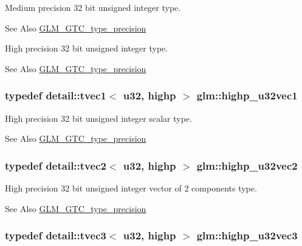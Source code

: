 Medium precision 32 bit unsigned integer type. \begin{DoxySeeAlso}{See Also}
\hyperlink{group__gtc__type__precision}{G\-L\-M\-\_\-\-G\-T\-C\-\_\-type\-\_\-precision}
\end{DoxySeeAlso}
High precision 32 bit unsigned integer type. \begin{DoxySeeAlso}{See Also}
\hyperlink{group__gtc__type__precision}{G\-L\-M\-\_\-\-G\-T\-C\-\_\-type\-\_\-precision} 
\end{DoxySeeAlso}
\hypertarget{group__gtc__type__precision_ga8a92d1f79e2fd4a03be803e35aac8e1b}{
\subsubsection[{highp\-\_\-u32vec1}]{\setlength{\rightskip}{0pt plus 5cm}typedef detail\-::tvec1$<$ u32, highp $>$ {\bf glm\-::highp\-\_\-u32vec1}}}\label{group__gtc__type__precision_ga8a92d1f79e2fd4a03be803e35aac8e1b}
High precision 32 bit unsigned integer scalar type. \begin{DoxySeeAlso}{See Also}
\hyperlink{group__gtc__type__precision}{G\-L\-M\-\_\-\-G\-T\-C\-\_\-type\-\_\-precision} 
\end{DoxySeeAlso}
\hypertarget{group__gtc__type__precision_gaddb81e8e12bd640e188744ed372c95bb}{
\subsubsection[{highp\-\_\-u32vec2}]{\setlength{\rightskip}{0pt plus 5cm}typedef detail\-::tvec2$<$ u32, highp $>$ {\bf glm\-::highp\-\_\-u32vec2}}}\label{group__gtc__type__precision_gaddb81e8e12bd640e188744ed372c95bb}
High precision 32 bit unsigned integer vector of 2 components type. \begin{DoxySeeAlso}{See Also}
\hyperlink{group__gtc__type__precision}{G\-L\-M\-\_\-\-G\-T\-C\-\_\-type\-\_\-precision} 
\end{DoxySeeAlso}
\hypertarget{group__gtc__type__precision_gab1e386f5e415e00f800edf5d15207286}{
\subsubsection[{highp\-\_\-u32vec3}]{\setlength{\rightskip}{0pt plus 5cm}typedef detail\-::tvec3$<$ u32, highp $>$ {\bf glm\-::highp\-\_\-u32vec3}}}\label{group__gtc__type__precision_gab1e386f5e415e00f800edf5d15207286}
